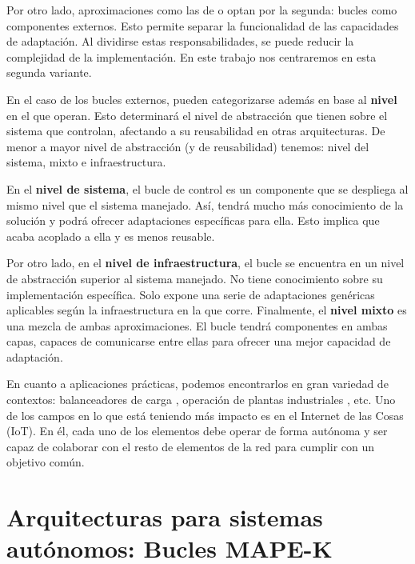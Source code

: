 Por otro lado, aproximaciones como las de \cite{ibmcorporationArchitecturalBlueprintAutonomic2006} o \cite{garlanIncreasingSystemDependability2003} optan por la segunda: bucles como componentes externos. Esto permite separar la funcionalidad de las capacidades de adaptación.  Al dividirse estas responsabilidades, se puede reducir la complejidad de la implementación. En este trabajo nos centraremos en esta segunda variante.

En el caso de los bucles externos, pueden categorizarse además en base al \textbf{nivel} en el que operan. \cite{mendoncaGeneralityVsReusability2018} Esto determinará el nivel de abstracción que tienen sobre el sistema que controlan, afectando a su reusabilidad en otras arquitecturas. De menor a mayor nivel de abstracción (y de reusabilidad) tenemos: nivel del sistema, mixto e infraestructura.

En el \textbf{nivel de sistema}, el bucle de control es un componente que se despliega al mismo nivel que el sistema manejado. Así, tendrá mucho más conocimiento de la solución y podrá ofrecer adaptaciones específicas para ella. Esto implica que acaba acoplado a ella y es menos reusable.

Por otro lado, en el \textbf{nivel de infraestructura}, el bucle se encuentra en un nivel de abstracción superior al sistema manejado. No tiene conocimiento sobre su implementación específica. Solo expone una serie de adaptaciones genéricas aplicables según la infraestructura en la que corre. Finalmente, el \textbf{nivel mixto} es una mezcla de ambas aproximaciones. El bucle tendrá componentes en ambas capas, capaces de comunicarse entre ellas para ofrecer una mejor capacidad de adaptación.

En cuanto a aplicaciones prácticas, podemos encontrarlos en gran variedad de contextos: balanceadores de carga \cite{mishraLoadBalancingCloud2020}, operación de plantas industriales \cite{climentpenadesDissenyPrototipatSolucions2020a}, etc. Uno de los campos en lo que está teniendo más impacto es en el Internet de las Cosas (IoT). \cite{savaglioAgentbasedInternetThings2020} En él, cada uno de los elementos debe operar de forma autónoma y ser capaz de colaborar con el resto de elementos de la red para cumplir con un objetivo común.

\section{Arquitecturas para sistemas autónomos: Bucles MAPE-K}
\label{sec:bucles-mapek}

